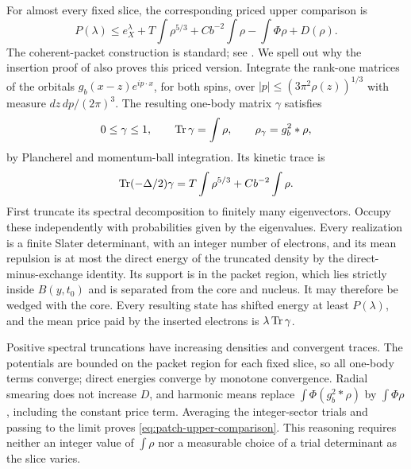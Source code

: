 For almost every fixed slice, the corresponding priced upper comparison is
\begin{equation}
 P(\lambda)\leq e_X^\lambda+T\int\rho^{5/3}
                   +Cb^{-2}\int\rho-\int\Phi\rho+D(\rho).
 \label{eq:patch-upper-comparison}
\end{equation}
The coherent-packet construction is standard; see
\cite[Lemma~8.2]{Solovej2003}. We spell out why the insertion proof of
\cite[\FInsertion]{Foundation} also proves this priced version.
Integrate the rank-one matrices of the orbitals
$g_b(x-z)e^{ip\cdot x}$, for both spins, over
$|p|\leq(3\pi^2\rho(z))^{1/3}$ with measure $dz\,dp/(2\pi)^3$.
The resulting one-body matrix $\gamma$ satisfies
\[
 0\leq\gamma\leq1,\qquad \operatorname{Tr}\gamma=\int\rho,\qquad
 \rho_\gamma=g_b^2*\rho,
\]
by Plancherel and momentum-ball integration.  Its kinetic trace is
\[
 \operatorname{Tr}(-\Delta/2)\gamma=T\int\rho^{5/3}+Cb^{-2}\int\rho.
\]
First truncate its spectral decomposition to finitely many eigenvectors.
Occupy these independently with probabilities given by the eigenvalues.
Every realization is a finite Slater determinant, with an integer number
of electrons, and its mean repulsion is at most the direct energy of the
truncated density by the direct-minus-exchange identity.  Its support is
in the packet region, which lies strictly inside $B(y,t_0)$ and is
separated from the core and nucleus.  It may therefore be wedged with
the core.  Every resulting state has shifted energy at least
$P(\lambda)$, and the mean price paid by the inserted electrons is
$\lambda\operatorname{Tr}\gamma$.

Positive spectral truncations have increasing densities and convergent
traces.  The potentials are bounded on the packet region for each fixed
slice, so all one-body terms converge; direct energies converge by
monotone convergence.  Radial smearing does not increase $D$, and
harmonic means replace $\int\Phi(g_b^2*\rho)$ by $\int\Phi\rho$,
including the constant price term.  Averaging the integer-sector trials
and passing to the limit proves \cref{eq:patch-upper-comparison}.
This reasoning requires neither an integer value of $\int\rho$ nor a
measurable choice of a trial determinant as the slice varies.

